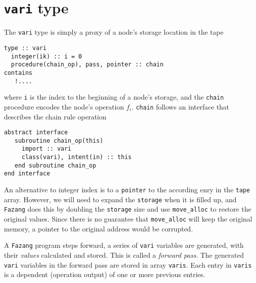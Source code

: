 \documentclass[12pt, reqno, oneside]{amsbook}
\begin{document}
\section{\texttt{vari} type}
\label{sec:orgbd59130}
The \texttt{vari} type is simply a proxy of a node's storage location in the tape
\begin{verbatim}
type :: vari
  integer(ik) :: i = 0
  procedure(chain_op), pass, pointer :: chain
contains
   !....
\end{verbatim}
where \texttt{i} is the index to the beginning of a node's storage, and the
\texttt{chain} procedure encodes the node's operation
\(f_i\). \texttt{chain} follows an interface that describes the chain rule
operation
\begin{verbatim}
abstract interface
   subroutine chain_op(this)
     import :: vari
     class(vari), intent(in) :: this
   end subroutine chain_op
end interface
\end{verbatim}
An alternative to integer index is to a \texttt{pointer} to the according
enry in the \texttt{tape} array. However, we will need to expand the
\texttt{storage} when it is filled up, and \texttt{Fazang} does this by doubling the
\texttt{storage} size and use \texttt{move\_alloc} to
restore the original values. Since there is no guarantee that \texttt{move\_alloc}
will keep the original memory, a pointer to the original address would
be corrupted.

A \texttt{Fazang} program steps forward, a series of \texttt{vari} variables are
generated, with their \emph{values} calculated and stored. This is called
a \emph{forward pass}. The generated \texttt{vari} variables in the forward pass are
stored in array \texttt{varis}. Each entry in \texttt{varis} is a dependent
(operation output) of one or more previous entries.
\end{document}
